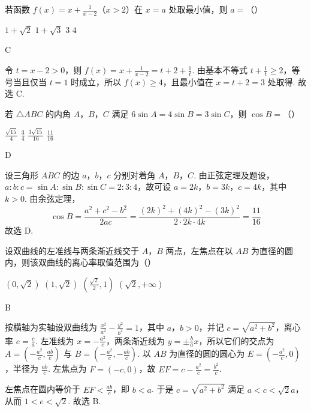 \begin{problem}
若函数 \( f(x) = x + \frac{1}{x - 2} \)（\(x > 2\)）在 \( x = a \) 处取最小值，则 \( a = \)（\quad）

\choices
    {\(1 + \sqrt{2}\)}
    {\(1 + \sqrt{3}\)}
    {\(3\)}
    {\(4\)}
\end{problem}

\begin{answer}
    C
\end{answer}

\begin{solution}
令 \(t=x-2>0\)，则
\(f(x)=x+\frac{1}{x-2}=t+2+\frac1t\). 由基本不等式
\(t+\frac1t\geq2\)，等号当且仅当 \(t=1\) 时成立，所以 \(f(x)\geq4\)，且最小值在 \(x=t+2=3\) 处取得. 故选 C.
\end{solution}

\begin{problem}
若 \(\triangle ABC\) 的内角 \(A\)，\(B\)，\(C\) 满足 \(6\sin A = 4\sin B = 3\sin C\)，则 \(\cos B =\)（\quad）

\choices
    {\(\frac{\sqrt{15}}{4}\)}
    {\(\frac{3}{4}\)}
    {\(\frac{3\sqrt{15}}{16}\)}
    {\(\frac{11}{16}\)}
\end{problem}

\begin{answer}
    D
\end{answer}

\begin{solution}
设三角形 \(ABC\) 的边 \(a\)，\(b\)，\(c\) 分别对着角 \(A\)，\(B\)，\(C\). 由正弦定理及题设，
\(a:b:c=\sin A:\sin B:\sin C=2:3:4\)，故可设 \(a=2k\)，\(b=3k\)，\(c=4k\)，其中 \(k>0\). 由余弦定理，
\[
\cos B=\frac{a^{2}+c^{2}-b^{2}}{2ac}=\frac{(2k)^{2}+(4k)^{2}-(3k)^{2}}{2\cdot2k\cdot4k}=\frac{11}{16}
\]
故选 D.
\end{solution}

\begin{problem}
设双曲线的左准线与两条渐近线交于 \(A\)，\(B\) 两点，左焦点在以 \(AB\) 为直径的圆内，则该双曲线的离心率取值范围为（\quad）

\choices
    {\(\left(0,\sqrt{2}\right)\)}
    {\(\left(1,\sqrt{2}\right)\)}
    {\(\left(\frac{\sqrt{2}}{2}, 1\right)\)}
    {\(\left(\sqrt{2},+\infty\right)\)}
\end{problem}

\begin{answer}
    B
\end{answer}

\begin{solution}
按横轴为实轴设双曲线为 \(\frac{x^{2}}{a^{2}}-\frac{y^{2}}{b^{2}}=1\)，其中 \(a\)，\(b>0\)，并记 \(c=\sqrt{a^{2}+b^{2}}\)，离心率 \(e=\frac ca\). 左准线为 \(x=-\frac{a^{2}}c\)，两条渐近线为 \(y=\pm\frac ba x\)，所以它们的交点为
\(A=(-\frac{a^{2}}c,\frac{ab}c)\) 与 \(B=(-\frac{a^{2}}c,-\frac{ab}c)\). 以 \(AB\) 为直径的圆的圆心为 \(E=(-\frac{a^{2}}c,0)\)，半径为 \(\frac{ab}c\). 左焦点为 \(F=(-c,0)\)，故
\(EF=c-\frac{a^{2}}c=\frac{b^{2}}c\).

左焦点在圆内等价于 \(EF<\frac{ab}c\)，即 \(b<a\). 于是
\(c=\sqrt{a^{2}+b^{2}}\) 满足 \(a<c<\sqrt2a\)，从而 \(1<e<\sqrt2\). 故选 B.
\end{solution}

